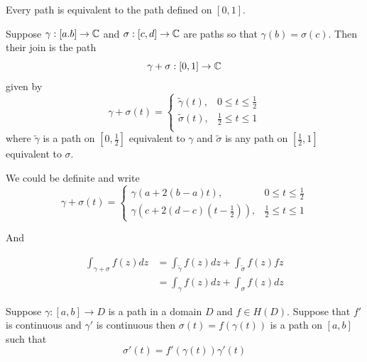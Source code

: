 \documentclass[12pt]{article}
\begin{document}
\begin{corollary}
    Every path is equivalent to the path defined on $[0,1]$. 
\end{corollary}

\begin{definition}
    Suppose $\gamma:[a.b] \to \mathbb C$ and $\sigma:[c,d] \to \mathbb C$ are paths so that $\gamma(b) = \sigma(c)$. Then their join is the path 
    \[\gamma + \sigma : [0,1] \to \mathbb C\]
    given by 
    \[\gamma + \sigma(t) = \begin{cases}
        \tilde{\gamma} (t), & 0 \leq t \leq \frac{1}{2} \\ 
        \tilde{\sigma} (t), & \frac{1}{2} \leq t \leq 1 \\ 
    \end{cases}\]
    where $\tilde{\gamma}$ is a path on $\left[0, \frac{1}{2}\right]$ equivalent to $\gamma$ and $\tilde{\sigma}$ is any path on $\left[ \frac{1}{2},1\right]$ equivalent to $\sigma$. 

    We could be definite and write 
    \[\gamma + \sigma(t) = \begin{cases}
        \gamma(a + 2(b-a)t), & 0 \leq t \leq \frac{1}{2} \\ 
        \gamma(c + 2(d-c)(t - \frac{1}{2})), &  \frac{1}{2} \leq t \leq 1 
    \end{cases}\]

    And

    \begin{align*}
        \int_{\gamma + \sigma} f(z) dz &= \int_{\tilde{\gamma}} f(z) dz + \int_{\tilde{\sigma}} f(z) fz \\ 
        &= \int_\gamma f(z) dz + \int_\sigma f(z)dz 
    \end{align*}
\end{definition}

\begin{lemma}[3.7]
    Suppose $\gamma:[a,b] \to D$ is a path in a domain $D$ and $f \in H(D)$. Suppose that $f'$ is continuous and $\gamma'$ is continuous then $\sigma(t) = f(\gamma (t))$ is a path on $[a,b]$ such that 
    \[\sigma'(t) = f'(\gamma(t))\gamma'(t)\]
\end{lemma}
\end{document}
